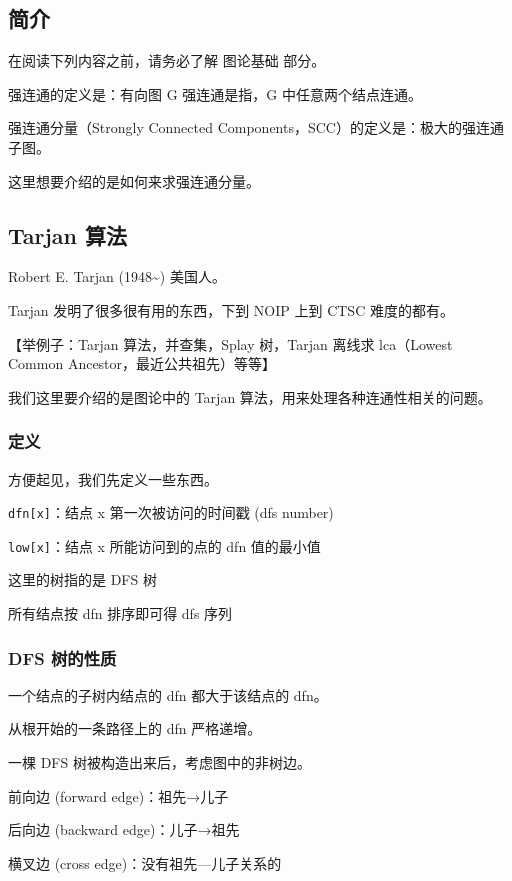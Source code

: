
\subsection{简介}

在阅读下列内容之前，请务必了解  图论基础  部分。

强连通的定义是：有向图 G 强连通是指，G 中任意两个结点连通。

强连通分量（Strongly Connected Components，SCC）的定义是：极大的强连通子图。

这里想要介绍的是如何来求强连通分量。

\subsection{Tarjan 算法}

Robert E. Tarjan (1948\textasciitilde{}) 美国人。

Tarjan 发明了很多很有用的东西，下到 NOIP 上到 CTSC 难度的都有。

【举例子：Tarjan 算法，并查集，Splay 树，Tarjan 离线求 lca（Lowest Common Ancestor，最近公共祖先）等等】

我们这里要介绍的是图论中的 Tarjan 算法，用来处理各种连通性相关的问题。

\subsubsection{定义}

方便起见，我们先定义一些东西。

\texttt{dfn[x]}：结点 x 第一次被访问的时间戳 (dfs number)

\texttt{low[x]}：结点 x 所能访问到的点的 dfn 值的最小值

这里的树指的是 DFS 树

所有结点按 dfn 排序即可得 dfs 序列

\subsubsection{DFS 树的性质}

一个结点的子树内结点的 dfn 都大于该结点的 dfn。 

从根开始的一条路径上的 dfn 严格递增。

一棵 DFS 树被构造出来后，考虑图中的非树边。

前向边 (forward edge)：祖先→儿子

后向边 (backward edge)：儿子→祖先

横叉边 (cross edge)：没有祖先—儿子关系的

